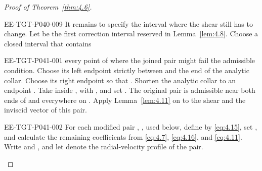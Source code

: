 \begin{proof}[Proof of Theorem~\ref{thm:4.6}]
\begin{EESegment}{EE-TGT-P040-009}
It remains to specify the interval where the shear still has to change. Let
 be the first correction interval reserved in
Lemma~\ref{lem:4.8}. Choose a closed interval
 that contains
\end{EESegment}
\begin{EESegment}{EE-TGT-P041-001}
every point of  where the joined pair might fail the
admissible condition. Choose its left endpoint strictly between
 and the end of the analytic collar. Choose its right endpoint so that
. Shorten the analytic collar to an
endpoint . Take
 inside , with
, and set
. The original pair is admissible near both ends of
 and everywhere on
. Apply Lemma~\ref{lem:4.11} on
 to the shear
 and the inviscid vector
 of this pair.
\end{EESegment}
\begin{EESegment}{EE-TGT-P041-002}
For each modified pair ,
, used below, define
 by \eqref{eq:4.15}, set
, and calculate the remaining coefficients from
\eqref{eq:4.7}, \eqref{eq:4.16}, and \eqref{eq:4.11}. Write
 and , and let
 denote the radial-velocity profile of the pair.
\end{EESegment}


\end{proof}

